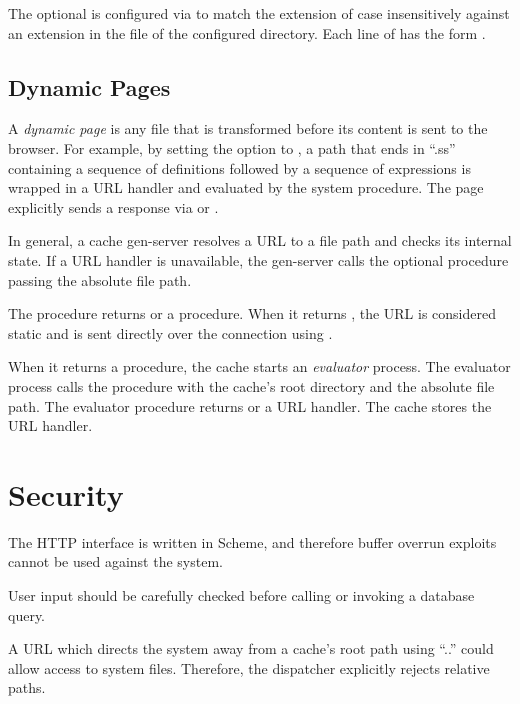 The optional  is configured via
 to match the extension of
 case insensitively against an extension in the
 file of the configured directory. Each line of
 has the form
.

\subsection{Dynamic Pages}\label{sec:dynamic-pages}

A \emph{dynamic page} is any file that is transformed before its
content is sent to the browser. For example, by setting the option
 to , a path that
ends in ``.ss'' containing a sequence of definitions followed by a
sequence of expressions is wrapped in a URL handler and evaluated by
the  system procedure. The page explicitly sends a response
via  or .

In general, a cache gen-server resolves a URL to a file path and
checks its internal state. If a URL handler is unavailable, the
gen-server calls the optional  procedure passing
the absolute file path.

The  procedure returns  or a
procedure. When it returns , the URL is considered static
and is sent directly over the connection using
.

When it returns a procedure, the cache starts an \emph{evaluator}
process. The evaluator process calls the procedure with the cache's
root directory and the absolute file path. The evaluator procedure
returns  or a URL handler. The cache stores the URL handler.

\section {Security}

The HTTP interface is written in Scheme, and therefore buffer overrun
exploits cannot be used against the system.

User input should be carefully checked before calling  or
invoking a database query.

A URL which directs the system away from a cache's root path using
``..'' could allow access to system files. Therefore, the dispatcher
explicitly rejects relative paths.


